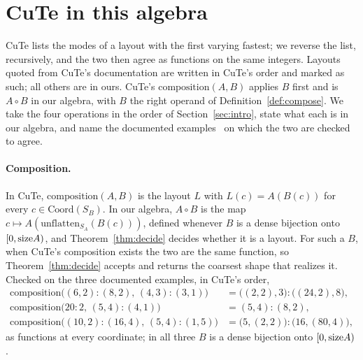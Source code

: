 \section{CuTe in this algebra}\label{sec:cute}\label{sec:idioms}

CuTe lists the modes of a layout with the first varying fastest; we reverse
the list, recursively, and the two then agree as functions on the same
integers. Layouts quoted from CuTe's documentation are written in CuTe's
order and marked as such; all others are in ours. CuTe's $\mathrm{composition}(A,B)$ applies $B$ first and is
$A \circ B$ in our algebra, with $B$ the right operand of
Definition~\ref{def:compose}. We take the four operations in the order of
Section~\ref{sec:intro}, state what each is in our algebra, and name the
documented examples~\cite{cutedocs} on which
the two are checked to agree.

\paragraph{Composition.} In CuTe, $\mathrm{composition}(A,B)$ is the layout
$L$ with $L(c) = A(B(c))$ for every $c \in \mathrm{Coord}(S_B)$. In our
algebra, $A \circ B$ is the map $c \mapsto A(\mathrm{unflatten}_{S_A}(B(c)))$, defined whenever $B$
is a dense bijection onto $[0,\mathrm{size} A)$, and Theorem~\ref{thm:decide} decides
whether it is a layout. For such a $B$, when CuTe's composition exists the
two are the same function, so Theorem~\ref{thm:decide} accepts and returns
the coarsest shape that realizes it. Checked on the three documented examples,
in CuTe's order,
\begin{align*}
\mathrm{composition}\big((6,2){:}(8,2),\,(4,3){:}(3,1)\big)
  &= \big((2,2),3\big){:}\big((24,2),8\big),\\
\mathrm{composition}\big(20{:}2,\,(5,4){:}(4,1)\big) &= (5,4){:}(8,2),\\
\mathrm{composition}\big((10,2){:}(16,4),\,(5,4){:}(1,5)\big)
  &= \big(5,(2,2)\big){:}\big(16,(80,4)\big),
\end{align*}
as functions at every coordinate; in all three $B$ is a dense bijection onto
$[0,\mathrm{size} A)$.

